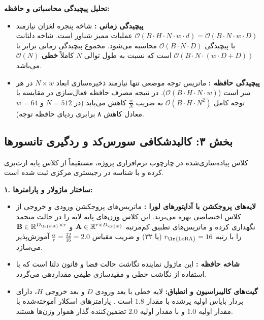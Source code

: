 \textbf{تحلیل پیچیدگی محاسباتی و حافظه:}
\begin{itemize}
    \item \textbf{پیچیدگی زمانی :} شاخه پنجره لغزان نیازمند $\mathcal{O}(B \cdot H \cdot N \cdot w \cdot d) = \mathcal{O}(B \cdot N \cdot w \cdot D)$ عملیات ممیز شناور است. شاخه دلتانت با پیچیدگی $\mathcal{O}(B \cdot N \cdot D)$ محاسبه می‌شود. مجموع پیچیدگی زمانی برابر با $\mathcal{O}(B \cdot N \cdot (w \cdot D + D))$ است که نسبت به طول توالی $N$ کاملاً \textbf{خطی} $\mathcal{O}(N)$ می‌باشد.
    \item \textbf{پیچیدگی حافظه :} ماتریس توجه موضعی تنها نیازمند ذخیره‌سازی ابعاد $N \times w$ در هر سر است ($\mathcal{O}(B \cdot H \cdot N \cdot w)$). در نتیجه مصرف حافظه فعال‌سازی در مقایسه با توجه کامل $\mathcal{O}(B \cdot H \cdot N^2)$ به ضریب $\frac{w}{N}$ کاهش می‌یابد (در $N=512$ و $w=64$ معادل کاهش ۸ برابری ردپای حافظه توجه).
\end{itemize}

\subsection*{بخش ۳: کالبدشکافی سورس‌کد و ردگیری تانسورها }
کلاس پیاده‌سازی‌شده  در چارچوب نرم‌افزاری پروژه، مستقیماً از کلاس پایه  ارث‌بری کرده و با شناسه  در رجیستری مرکزی ثبت شده است.

\textbf{۱. ساختار ماژولار و پارامترها:}
\begin{itemize}
    \item \textbf{لایه‌های پروجکشن با آداپتورهای لورا :} ماتریس‌های پروجکشن ورودی و خروجی  از کلاس اختصاصی  بهره می‌برند. این کلاس وزن‌های پایه لایه را در حالت منجمد  نگهداری کرده و ماتریس‌های تطبیق کم‌مرتبه $\mathbf{A} \in \mathbb{R}^{r \times D_{\text{\lr{in}}}}$ و $\mathbf{B} \in \mathbb{R}^{D_{\text{\lr{out}}} \times r}$ را با رتبه $r_{\text{\lr{LoRA}}} = 16$ (یا ۳۲) و ضریب مقیاس $\frac{\alpha}{r} = \frac{32}{16} = 2.0$ آموزش‌پذیر می‌سازد.
    \item \textbf{شاخه حافظه :} این ماژول نماینده نگاشت حالت فضا و قانون دلتا است که با استفاده از نگاشت خطی و مقیدسازی طیفی  مقداردهی می‌گردد.
    \item \textbf{گیت‌های کالیبراسیون و انطباق:} لایه خطی  با بعد ورودی $D$ و بعد خروجی $H$، دارای بردار بایاس اولیه پرشده با مقدار $1.8$ است . پارامترهای اسکلار آموخته‌شده  با مقدار اولیه $1.0$ و  با مقدار اولیه $2.0$ تضمین‌کننده گذار هموار وزن‌ها هستند.
\end{itemize}

